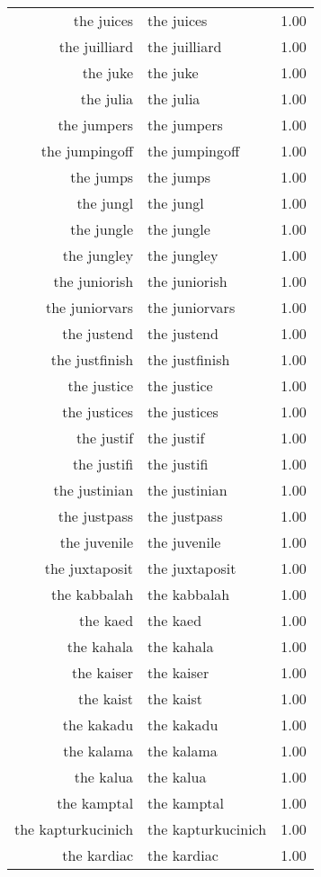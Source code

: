 \begin{table}[ht]
\begin{tabular}{rlr}
  the juices & the juices & 1.00 \\ 
  the juilliard & the juilliard & 1.00 \\ 
  the juke & the juke & 1.00 \\ 
  the julia & the julia & 1.00 \\ 
  the jumpers & the jumpers & 1.00 \\ 
  the jumpingoff & the jumpingoff & 1.00 \\ 
  the jumps & the jumps & 1.00 \\ 
  the jungl & the jungl & 1.00 \\ 
  the jungle & the jungle & 1.00 \\ 
  the jungley & the jungley & 1.00 \\ 
  the juniorish & the juniorish & 1.00 \\ 
  the juniorvars & the juniorvars & 1.00 \\ 
  the justend & the justend & 1.00 \\ 
  the justfinish & the justfinish & 1.00 \\ 
  the justice & the justice & 1.00 \\ 
  the justices & the justices & 1.00 \\ 
  the justif & the justif & 1.00 \\ 
  the justifi & the justifi & 1.00 \\ 
  the justinian & the justinian & 1.00 \\ 
  the justpass & the justpass & 1.00 \\ 
  the juvenile & the juvenile & 1.00 \\ 
  the juxtaposit & the juxtaposit & 1.00 \\ 
  the kabbalah & the kabbalah & 1.00 \\ 
  the kaed & the kaed & 1.00 \\ 
  the kahala & the kahala & 1.00 \\ 
  the kaiser & the kaiser & 1.00 \\ 
  the kaist & the kaist & 1.00 \\ 
  the kakadu & the kakadu & 1.00 \\ 
  the kalama & the kalama & 1.00 \\ 
  the kalua & the kalua & 1.00 \\ 
  the kamptal & the kamptal & 1.00 \\ 
  the kapturkucinich & the kapturkucinich & 1.00 \\ 
  the kardiac & the kardiac & 1.00 \\ 

\end{tabular}
\end{table}
